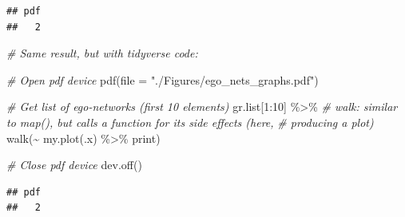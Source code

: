 \documentclass[
]{book}
\newenvironment{Shaded}{\begin{snugshade}}{\end{snugshade}}
\newcommand{\AttributeTok}[1]{\textcolor[rgb]{0.77,0.63,0.00}{#1}}
\newcommand{\CommentTok}[1]{\textcolor[rgb]{0.56,0.35,0.01}{\textit{#1}}}
\newcommand{\DecValTok}[1]{\textcolor[rgb]{0.00,0.00,0.81}{#1}}
\newcommand{\FunctionTok}[1]{\textcolor[rgb]{0.00,0.00,0.00}{#1}}
\newcommand{\NormalTok}[1]{#1}
\newcommand{\SpecialCharTok}[1]{\textcolor[rgb]{0.00,0.00,0.00}{#1}}
\newcommand{\StringTok}[1]{\textcolor[rgb]{0.31,0.60,0.02}{#1}}
\begin{document}
\begin{verbatim}
## pdf 
##   2
\end{verbatim}

\begin{Shaded}
\begin{Highlighting}[]
\CommentTok{\# Same result, but with tidyverse code:}

\CommentTok{\# Open pdf device}
\FunctionTok{pdf}\NormalTok{(}\AttributeTok{file =} \StringTok{"./Figures/ego\_nets\_graphs.pdf"}\NormalTok{)}

\CommentTok{\# Get list of ego{-}networks (first 10 elements)}
\NormalTok{gr.list[}\DecValTok{1}\SpecialCharTok{:}\DecValTok{10}\NormalTok{] }\SpecialCharTok{\%\textgreater{}\%}
  \CommentTok{\# walk: similar to map(), but calls a function for its side effects (here,}
  \CommentTok{\# producing a plot)}
  \FunctionTok{walk}\NormalTok{(}\SpecialCharTok{\textasciitilde{}} \FunctionTok{my.plot}\NormalTok{(.x) }\SpecialCharTok{\%\textgreater{}\%}\NormalTok{ print)}

\CommentTok{\# Close pdf device}
\FunctionTok{dev.off}\NormalTok{()}
\end{Highlighting}
\end{Shaded}

\begin{verbatim}
## pdf 
##   2
\end{verbatim}
\end{document}
